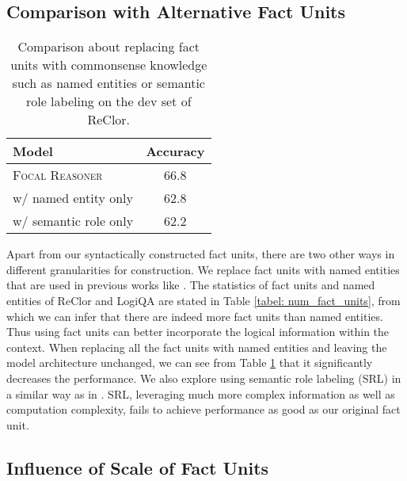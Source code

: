 \documentclass[11pt]{article}
\begin{document}
\subsection{Comparison with Alternative Fact Units}

\begin{table}
\centering
\setlength{\belowcaptionskip}{2pt}
\vspace*{-2mm}
\small
\setlength{\tabcolsep}{23.0pt}
\begin{tabular}{lc}
    \toprule
    Model    & Accuracy \\
    \midrule
    \textsc{Focal Reasoner} & 66.8\scriptsize \\
    \quad w/ named entity only & 62.8\scriptsize \\
    \quad w/ semantic role only & 62.2\scriptsize\\
    \bottomrule
\end{tabular}
  \caption{Comparison about replacing fact units with commonsense knowledge such as named entities or semantic role labeling on the dev set of ReClor.}\label{comp_facts}
\vspace*{-5mm}
\end{table}

Apart from our syntactically constructed fact units, there are two other ways in different granularities for construction. We replace fact units with named entities that are used in previous works like \cite{Chen2019MultihopQA}. The statistics of fact units and named entities of ReClor and LogiQA are stated in Table \ref{tabel: num_fact_units}, from which we can infer that there are indeed more fact units than named entities. Thus using fact units can better incorporate the logical information within the context. When replacing all the fact units with named entities and leaving the model architecture unchanged, we can see from Table \ref{comp_facts} that it significantly decreases the performance. We also explore using semantic role labeling (SRL) in a similar way as in \cite{Zhong2020ReasoningOS}. SRL, leveraging much more complex information as well as computation complexity, fails to achieve performance as good as our original fact unit.





\subsection{Influence of Scale of Fact Units}
\end{document}
